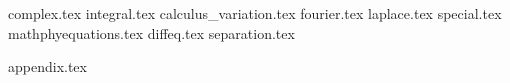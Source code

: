 \documentclass[
]{ctexbook}
\begin{document}


% 
% 

\setcounter{secnumdepth}{4}
\setcounter{tocdepth}{4}
\tableofcontents
% 


% 
% 

% 
% 
% 

{complex.tex}
{integral.tex}
{calculus_variation.tex}
{fourier.tex}
{laplace.tex}
{special.tex}
{mathphyequations.tex}
{diffeq.tex}
{separation.tex}



{appendix.tex}
\end{document}
